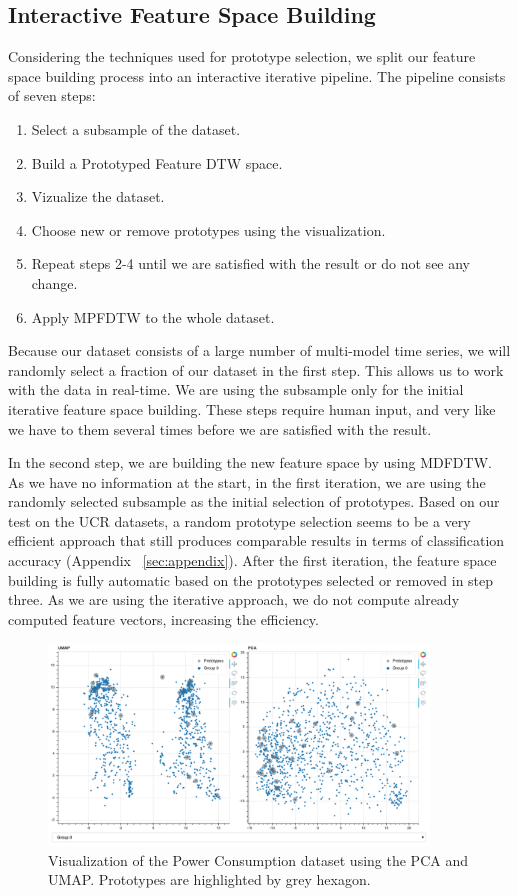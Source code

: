 \subsection{Interactive Feature Space Building}
Considering the techniques used for prototype selection, we split our feature space building process into an interactive iterative pipeline. The pipeline consists of seven steps:
\begin{enumerate}
    \item Select a subsample of the dataset.
    \item Build a Prototyped Feature DTW space.
    \item Vizualize the dataset.
    \item Choose new or remove prototypes using the visualization.
    \item Repeat steps 2-4 until we are satisfied with the result or do not see any change.
    \item Apply MPFDTW to the whole dataset.
\end{enumerate}

Because our dataset consists of a large number of multi-model time series, we will randomly select a fraction of our dataset in the first step. This allows us to work with the data in real-time. We are using the subsample only for the initial iterative feature space building. These steps require human input, and very like we have to them several times before we are satisfied with the result.

In the second step, we are building the new feature space by using MDFDTW. As we have no information at the start, in the first iteration, we are using the randomly selected subsample as the initial selection of prototypes. Based on our test on the UCR datasets, a random prototype selection seems to be a very efficient approach that still produces comparable results in terms of classification accuracy (Appendix ~\ref{sec:appendix}). After the first iteration, the feature space building is fully automatic based on the prototypes selected or removed in step three. As we are using the iterative approach, we do not compute already computed feature vectors, increasing the efficiency.
\begin{figure}[htp]
    \centering
    \includegraphics[width=0.9\textwidth]{img/prototypes.png}
    \caption{Visualization of the Power Consumption dataset using the PCA and UMAP. Prototypes are highlighted by grey hexagon.}
    \label{fig:prototypes}
\end{figure}

